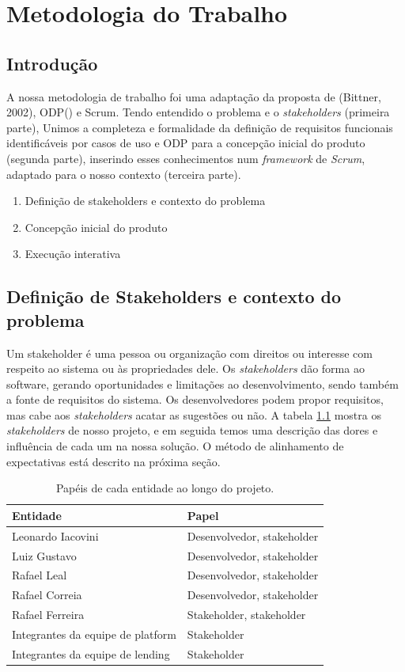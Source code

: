 \chapter{Metodologia do Trabalho}
\section{Introdução}
A nossa metodologia de trabalho foi uma adaptação da proposta de (Bittner, 2002)\cite{usecases}, ODP() e Scrum\cite{essentialscrum}. Tendo entendido o problema e o \textit{stakeholders} (primeira parte), Unimos a completeza e formalidade da definição de requisitos funcionais identificáveis por casos de uso e ODP para a concepção inicial do produto (segunda parte), inserindo esses conhecimentos num \textit{framework} de \textit{Scrum}, adaptado para o nosso contexto (terceira parte).
\begin{enumerate}
    \item Definição de stakeholders e contexto do problema
    \item Concepção inicial do produto
    \item Execução interativa
\end{enumerate}

\section{Definição de Stakeholders e contexto do problema}
Um stakeholder é uma pessoa ou organização com direitos ou interesse com respeito ao sistema ou às propriedades dele. Os \textit{stakeholders} dão forma ao software, gerando oportunidades e limitações ao desenvolvimento, sendo também a fonte de requisitos do sistema. Os desenvolvedores podem propor requisitos, mas cabe aos \textit{stakeholders} acatar as sugestões ou não.
A tabela \ref{tab:roles} mostra os \textit{stakeholders} de nosso projeto, e em seguida temos uma descrição das dores e influência de cada um na nossa solução. O método de alinhamento de expectativas está descrito na próxima seção.

\begin{table}[ht]
\centering
\begin{tabular}{l l}
Entidade & Papel \\
\hline
Leonardo Iacovini   &   Desenvolvedor, stakeholder  \\
Luiz Gustavo &  Desenvolvedor, stakeholder  \\
Rafael Leal   &  Desenvolvedor, stakeholder \\
Rafael Correia   &  Desenvolvedor, stakeholder \\
Rafael Ferreira   &  Stakeholder, stakeholder \\
Integrantes da equipe de platform   &  Stakeholder \\
Integrantes da equipe de lending   &  Stakeholder 
\end{tabular}
\caption{Papéis de cada entidade ao longo do projeto.}
\label{tab:roles}
\end{table}
